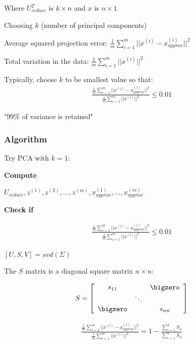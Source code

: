 Where \(U_{reduce}^T\) is \(k \times n\) and \(x\) is \(n \times 1\)

Choosing \(k\) (number of principal components)

Average squared projection error:
\(\frac{1}{m} \sum^m_{i=1} ||x^{(i)} - x_{approx}^{(i)}||^2\)

Total variation in the data: \(\frac{1}{m} \sum^m_{i=1} ||x^{(i)}||^2\)

Typically, choose \(k\) to be smallest value so that: \begin{align*}
\frac
{\frac{1}{m} \sum^m_{i=1} ||x^{(i)} - x_{approx}^{(i)}||^2}
{\frac{1}{m} \sum^m_{i=1} ||x^{(i)}||^2} \leq 0.01
\end{align*}

"99\% of variance is retained"

\hypertarget{algorithm}{%
\subsubsection{Algorithm}\label{algorithm}}

Try PCA with \(k=1\):

\textbf{Compute}

\(U_{reduce},z^{(1)},z^{(2)},\dots,z^{(m)},x^{(1)}_{approx},\dots,x^{(m)}_{approx}\)

\textbf{Check if}

\begin{align*}
\frac
{\frac{1}{m} \sum^m_{i=1} ||x^{(i)} - x_{approx}^{(i)}||^2}
{\frac{1}{m} \sum^m_{i=1} ||x^{(i)}||^2} \leq 0.01
\end{align*}

\([U,S,V] = svd(\Sigma)\)

The \(S\) matrix is a diagonal square matrix \(n \times n\):

\begin{align*}
S = \left[
\begin{array}{ccc}
s_{11}   &        & \bigzero \\
         & \ddots &          \\
\bigzero &        & s_{nn}   \\
\end{array}
\right]
\end{align*}

\begin{align*}
\frac
{\frac{1}{m} \sum^m_{i=1} ||x^{(i)} - x_{approx}^{(i)}||^2}
{\frac{1}{m} \sum^m_{i=1} ||x^{(i)}||^2} = 1 -
\frac
{\sum_{i=1}^k S_{ii}}
{\sum_{i=1}^n S_{ii}}
\end{align*}

